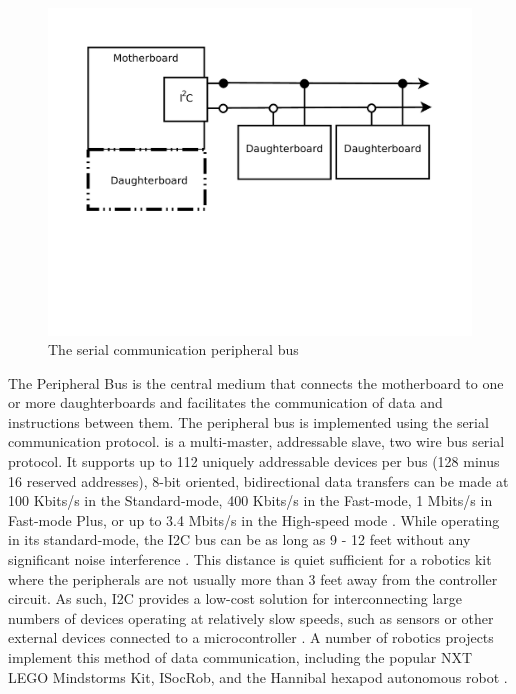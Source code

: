 	\begin{figure}[h]
	  \begin{center}
	    \includegraphics[width=1.0\columnwidth]{Figures/pbus.pdf}
	    \caption{The serial communication peripheral \iic bus}
	  \end{center}
	\end{figure}
	
	The Peripheral Bus is the central medium that connects the motherboard to one or more daughterboards and facilitates the communication of data and instructions between them. The peripheral bus is implemented using the \iic serial communication protocol. \iic is a multi-master, addressable slave, two wire bus serial protocol. It supports up to 112 uniquely addressable devices per bus (128 minus 16 reserved addresses), 8-bit oriented, bidirectional data transfers can be made at 100 Kbits/s in the Standard-mode, 400 Kbits/s in the Fast-mode, 1 Mbits/s in Fast-mode Plus, or up to 3.4 Mbits/s in the High-speed mode \parencite{indec}. While operating in its standard-mode, the I2C bus can be as long as 9 - 12 feet without any significant noise interference \parencite{nonoise}. This distance is quiet sufficient for a robotics kit where the peripherals are not usually more than 3 feet away from the controller circuit. As such, I2C provides a low-cost solution for interconnecting large numbers of devices operating at relatively slow speeds, such as sensors or other external devices connected to a microcontroller \parencite{again}. A number of robotics projects implement this method of data communication, including the popular NXT LEGO Mindstorms Kit, ISocRob, and the Hannibal hexapod autonomous robot \parencite{nuffadem}.
	
